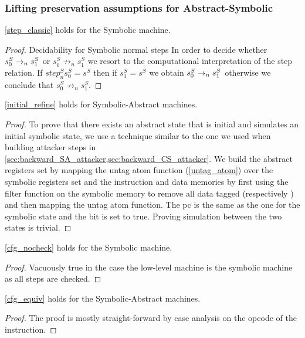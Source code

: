 \subsubsection{Lifting preservation assumptions for Abstract-Symbolic}

\begin{lemma}
  \label{step_classic_symbolic}
  \cref{step_classic} holds for the Symbolic machine.
\end{lemma}
\begin{proof}
  Decidability for Symbolic normal steps
  In order to decide whether $s^S_0\to_ns^S_1$ or
  $s^S_0 \not \to_n s^S_1$ we resort to the computational interpretation
  of the step relation. If $step^S_n s^S_0 = s^S$ then if 
  $s^S_1 = s^S$ we obtain $s^S_0\to_ns^S_1$ otherwise
  we conclude that $s^S_0 \not \to_n s^S_1$.
\end{proof}
\begin{lemma}
  \label{initial_refine_SA}
  \cref{initial_refine} holds for Symbolic-Abstract machines.
\end{lemma}
\begin{proof}
  To prove that there exists an abstract
  state that is initial and simulates an initial symbolic state, we
  use a technique similar to the one we used when building attacker
  steps in \cref{sec:backward_SA_attacker,sec:backward_CS_attacker}.
  We build the abstract registers set by mapping the untag atom
  function (\cref{untag_atom}) over the symbolic registers set and the
  instruction and data memories by first using the filter function on
  the symbolic memory to remove all data tagged \DATAname
  (respectively \INSTRname) and then mapping the untag atom function.
  The pc is the same as the one for the symbolic state and the \ok bit
  is set to true. Proving simulation between the two states is trivial.
\end{proof}

\begin{lemma}
  \label{cfg_nocheck_SA}
  \cref{cfg_nocheck} holds for the Symbolic machine.
\end{lemma}
\begin{proof}
  Vacuously true in the case the low-level machine is
  the symbolic machine as all steps are checked.
\end{proof}

\begin{lemma}
  \label{cfg_equiv_SA}
  \cref{cfg_equiv} holds for the Symbolic-Abstract machines.
\end{lemma}
\begin{proof}
  The proof is mostly straight-forward by case analysis on the
  opcode of the instruction.
\end{proof}

